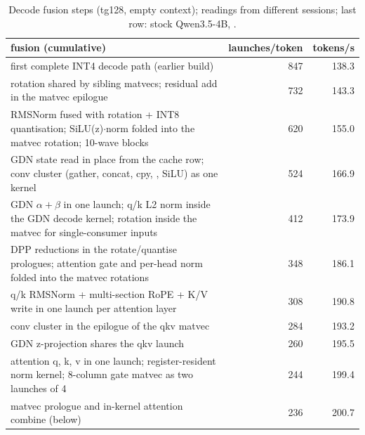 \documentclass[10.5pt,a4paper]{article}
\newcommand{\tx}[1]{\texttt{\detokenize{#1}}}
\begin{document}
\begin{table}[!ht]
\centering\small
\begin{tabularx}{\linewidth}{@{}>{\raggedright\arraybackslash}Xrr@{}}
\toprule
fusion (cumulative) & launches/token & tokens/s\\
\midrule
first complete INT4 decode path (earlier build) & 847 & 138.3\\
rotation shared by sibling matvecs; residual add in the matvec epilogue & 732 & 143.3\\
RMSNorm fused with rotation + INT8 quantisation; SiLU(z)$\cdot$norm folded into the \tx{ssm_out} matvec rotation; 10-wave blocks & 620 & 155.0\\
GDN state read in place from the cache row; conv cluster (gather, concat, cpy, \tx{ssm_conv}, SiLU) as one kernel & 524 & 166.9\\
GDN $\alpha{+}\beta$ in one launch; q/k L2 norm inside the GDN decode kernel; rotation inside the matvec for single-consumer inputs & 412 & 173.9\\
DPP reductions in the rotate/quantise prologues; attention gate and per-head norm folded into the matvec rotations & 348 & 186.1\\
q/k RMSNorm + multi-section RoPE + K/V write in one launch per attention layer & 308 & 190.8\\
conv cluster in the epilogue of the qkv matvec & 284 & 193.2\\
GDN z-projection shares the qkv launch & 260 & 195.5\\
attention q, k, v in one launch; register-resident norm kernel; 8-column gate matvec as two launches of 4 & 244 & 199.4\\
matvec prologue and in-kernel attention combine (below) & 236 & 200.7\\
\bottomrule
\end{tabularx}
\caption{Decode fusion steps (tg128, empty context); readings from different sessions; last row: stock Qwen3.5-4B, \tx{quality}.}
\end{table}
\end{document}
